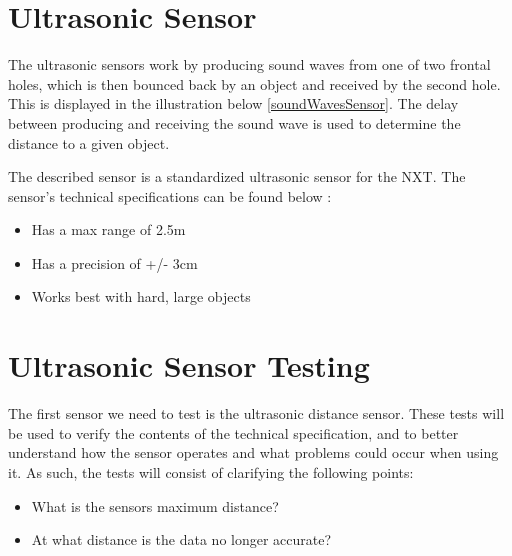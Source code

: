 \section{Ultrasonic Sensor}\label{SensTheoUltra}
The ultrasonic sensors work by producing sound waves from one of two frontal
holes, which is then bounced back by an object and received by the second hole.
This is displayed in the illustration below \autoref{soundWavesSensor}.
The delay between producing and receiving the sound wave is used to determine
the distance to a given object.



The described sensor is a standardized ultrasonic sensor for the NXT. The
sensor's technical specifications can be found below \citep{Ultrasonic_sensor}:
\begin{itemize}
  \item Has a max range of 2.5m
  \item Has a precision of +/- 3cm
  \item Works best with hard, large objects
\end{itemize}


\section{Ultrasonic Sensor Testing}\label{SensorTest}
The first sensor we need to test is the ultrasonic distance sensor. These tests
will be used to verify the contents of the technical specification, and
to better understand how the sensor operates and what
problems could occur when using it. As such, the tests will consist of
clarifying the following points:
\begin{itemize}
  \item What is the sensors maximum distance?
  \item At what distance is the data no longer accurate?
\end{itemize}

